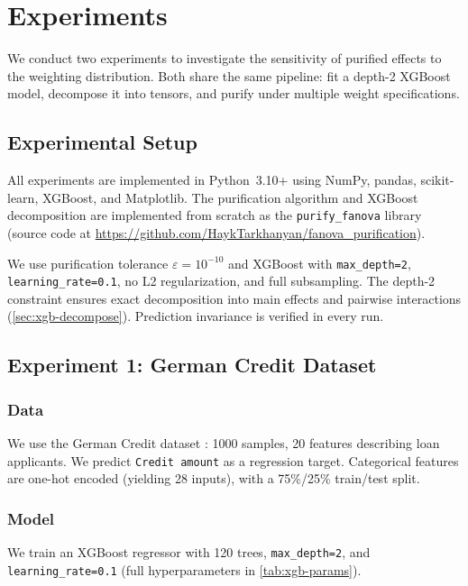 \chapter{Experiments}\label{chap:experiments}

We conduct two experiments to investigate the sensitivity of purified effects to the weighting distribution.
Both share the same pipeline: fit a depth-2 XGBoost \citep{chen2016xgboost} model, decompose it into tensors, and purify under multiple weight specifications.

\section{Experimental Setup}\label{sec:experimental-setup}

All experiments are implemented in Python~3.10+ using NumPy, pandas, scikit-learn, XGBoost, and Matplotlib.
The purification algorithm and XGBoost decomposition are implemented from scratch as the \texttt{purify\_fanova} library (source code at \url{https://github.com/HaykTarkhanyan/fanova_purification}).

We use purification tolerance $\varepsilon = 10^{-10}$ and XGBoost with \texttt{max\_depth=2}, \texttt{learning\_rate=0.1}, no L2 regularization, and full subsampling.
The depth-2 constraint ensures exact decomposition into main effects and pairwise interactions (\cref{sec:xgb-decompose}).
Prediction invariance is verified in every run.

\section{Experiment 1: German Credit Dataset}\label{sec:exp-german}

\subsection{Data}

We use the German Credit dataset \citep{dua2019uci}: 1000 samples, 20 features describing loan applicants.
We predict \texttt{Credit amount} as a regression target.
Categorical features are one-hot encoded (yielding 28 inputs), with a 75\%/25\% train/test split.

\subsection{Model}

We train an XGBoost regressor with 120 trees, \texttt{max\_depth=2}, and \texttt{learning\_rate=0.1} (full hyperparameters in \cref{tab:xgb-params}).

